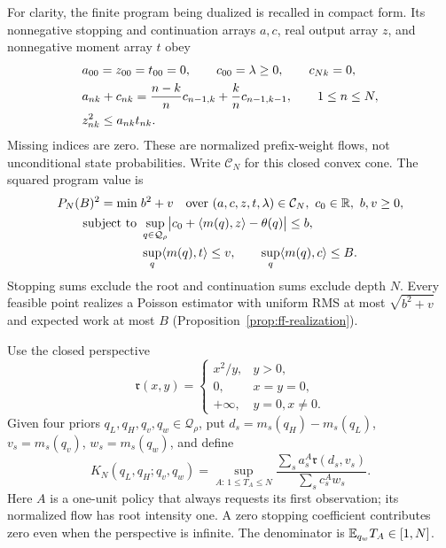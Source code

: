 For clarity, the finite program being dualized is recalled in compact
form. Its nonnegative stopping and continuation arrays $a,c$, real output
array $z$, and nonnegative moment array $t$ obey
\begin{align}
 &a_{00}=z_{00}=t_{00}=0,\qquad c_{00}=\lambda\ge0,
       \qquad c_{Nk}=0,\notag\\
 &a_{nk}+c_{nk}=\frac{n-k}{n}c_{n-1,k}
                    +\frac{k}{n}c_{n-1,k-1},
       \qquad 1\le n\le N,\notag\\
 &z_{nk}^2\le a_{nk}t_{nk}.
 \label{eq:dual-flow-cone}
\end{align}
Missing indices are zero. These are normalized prefix-weight flows, not
unconditional state probabilities. Write $\mathcal C_N$ for this closed
convex cone. The squared program value is
\begin{equation}
\begin{split}
 P_N(B)^2=\min\;&b^2+v\quad
       \text{over }(a,c,z,t,\lambda)\in\mathcal C_N,\ c_0\in\R,\ b,v\ge0,\\
 \text{subject to }&
 \sup_{q\in\mathcal Q_\rho}
       \bigl|c_0+\langle m(q),z\rangle-\theta(q)\bigr|\le b,\\
 &\sup_q\langle m(q),t\rangle\le v,\qquad
   \sup_q\langle m(q),c\rangle\le B.
\end{split}
\label{eq:dual-primal}
\end{equation}
Stopping sums exclude the root and continuation sums exclude depth $N$.
Every feasible point realizes a Poisson estimator with uniform RMS at
most $\sqrt{b^2+v}$ and expected work at most $B$
(Proposition~\ref{prop:ff-realization}).

Use the closed perspective
\[
 \mathfrak r(x,y)=
 \begin{cases}
 x^2/y,&y>0,\\
 0,&x=y=0,\\
 +\infty,&y=0, x\ne0.
 \end{cases}
\]
Given four priors $q_L,q_H,q_v,q_w\in\mathcal Q_\rho$, put
$d_s=m_s(q_H)-m_s(q_L)$, $v_s=m_s(q_v)$, $w_s=m_s(q_w)$, and define
\begin{equation}
 K_N(q_L,q_H;q_v,q_w)
 =\sup_{A:\,1\le T_A\le N}
 \frac{\displaystyle\sum_s a_s^A\mathfrak r(d_s,v_s)}
      {\displaystyle\sum_s c_s^A w_s}.
 \label{eq:dual-information-ratio}
\end{equation}
Here $A$ is a one-unit policy that always requests its first observation;
its normalized flow has root intensity one. A zero stopping coefficient
contributes zero even when the perspective is infinite. The denominator
is $\mathbb E_{q_w}T_A\in[1,N]$.

